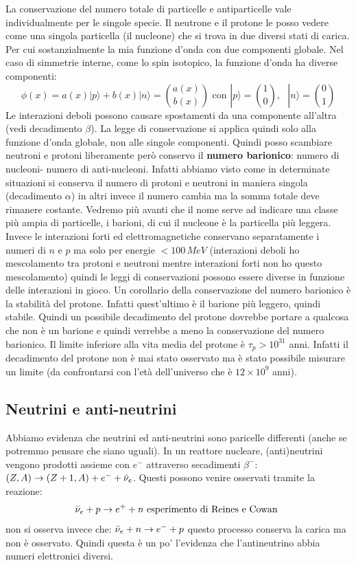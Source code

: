 La conservazione del numero totale di particelle e antiparticelle vale individualmente per le singole specie. Il neutrone e il protone le posso vedere come una singola particella (il nucleone) che si trova in due diversi stati di carica. Per cui sostanzialmente la mia funzione d'onda con due componenti globale. Nel caso di simmetrie interne, come lo spin isotopico, la funzione d'onda ha diverse componenti:
\begin{equation*}
    \phi(x)=a(x)|p\rangle+b(x)|n\rangle=\binom{a(x)}{b(x)} \text{ con } |p\rangle=\binom{1}{0}, \text{ } |n\rangle=\binom{0}{1}
\end{equation*}
Le interazioni deboli possono causare spostamenti da una componente all'altra (vedi decadimento $\beta$). La legge di conservazione si applica quindi solo alla funzione d'onda globale, non alle singole componenti. Quindi posso scambiare neutroni e protoni liberamente però conservo il \textbf{numero barionico}: numero di nucleoni- numero di anti-nucleoni. Infatti abbiamo visto come in determinate situazioni si conserva il numero di protoni e neutroni in maniera singola (decadimento $\alpha$) in altri invece il numero cambia ma la somma totale deve rimanere costante. Vedremo più avanti che il nome serve ad indicare una classe più ampia di particelle, i barioni, di cui il nucleone è la particella più leggera. Invece le interazioni forti ed elettromagnetiche conservano separatamente i numeri di $n$ e $p$ ma solo per energie $<100\,MeV$ (interazioni deboli ho mescolamento tra protoni e neutroni mentre interazioni forti non ho questo mescolamento) quindi le leggi di conservazioni possono essere diverse in funzione delle interazioni in gioco. Un corollario della conservazione del numero barionico è la stabilità del protone. Infatti quest'ultimo è il barione più leggero, quindi stabile. Quindi un possibile decadimento del protone dovrebbe portare a qualcosa che non è un barione e quindi verrebbe a meno la conservazione del numero barionico. Il limite inferiore alla vita media del protone è $\tau_p>10^{31}$ anni. Infatti il decadimento del protone non è mai stato osservato ma è stato possibile misurare un limite (da confrontarsi con l'età dell'universo che è $12\times 10^9$ anni).
\subsection{Neutrini e anti-neutrini}
Abbiamo evidenza che neutrini ed anti-neutrini sono paricelle differenti (anche se potremmo pensare che siano uguali). In un reattore nucleare, (anti)neutrini vengono prodotti assieme con $e^-$ attraverso secadimenti $\beta^-$: $(Z,A)\to(Z+1,A)+e^-+\Bar{\nu}_e$. Questi possono venire osservati tramite la reazione:
\begin{equation*}
    \Bar{\nu}_e+p\to e^+ +n \text{ esperimento di Reines e Cowan }
\end{equation*} 
non si osserva invece che: $\Bar{\nu}_e+n\to e^-+p$ questo processo conserva la carica ma non è osservato. Quindi questa è un po' l'evidenza che l'antineutrino abbia numeri elettronici diversi. 

